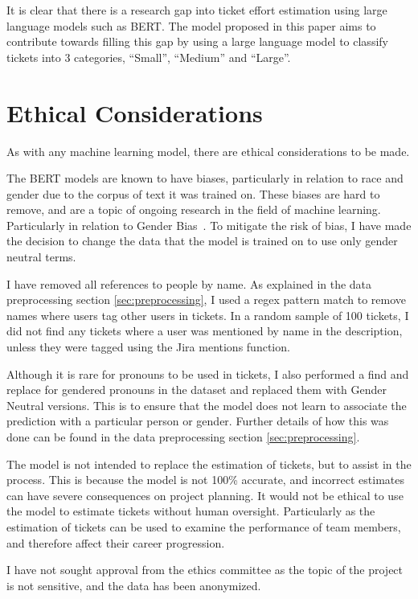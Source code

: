\documentclass{UoYCSproject}
\begin{document}
    It is clear that there is a research gap into ticket effort estimation using large language models such as BERT.
    The model proposed in this paper aims to contribute towards filling this gap by using a large language model to classify tickets into 3 categories, “Small”, “Medium” and “Large”.

    \chapter{Ethical Considerations}\label{cha:ethical considerations}
    As with any machine learning model, there are ethical considerations to be made.

    The BERT models are known to have biases, particularly in relation to race and gender due to the corpus of text it was trained on.
    These biases are hard to remove, and are a topic of ongoing research in the field of machine learning. Particularly in relation to Gender Bias~\cite{Jentzsch_2022, li2021detecting}.
    To mitigate the risk of bias, I have made the decision to change the data that the model is trained on to use only gender neutral terms.

    I have removed all references to people by name.
As explained in the data preprocessing section \ref{sec:preprocessing}, I used a regex pattern match to remove names where users tag other users in tickets.
    In a random sample of 100 tickets, I did not find any tickets where a user was mentioned by name in the description, unless they were tagged using the Jira mentions function.

    Although it is rare for pronouns to be used in tickets, I also performed a find and replace for gendered pronouns in the dataset and replaced them with Gender Neutral versions.
   This is to ensure that the model does not learn to associate the prediction with a particular person or gender. Further details of how this was done can be found in the data preprocessing section \ref{sec:preprocessing}.

    The model is not intended to replace the estimation of tickets, but to assist in the process. This is because the model is not 100\% accurate, and incorrect estimates can have severe consequences on project planning.
    It would not be ethical to use the model to estimate tickets without human oversight. Particularly as the estimation of tickets can be used to examine the performance of team members, and therefore affect their career progression.

    I have not sought approval from the ethics committee as the topic of the project is not sensitive, and the data has been anonymized.
\end{document}
